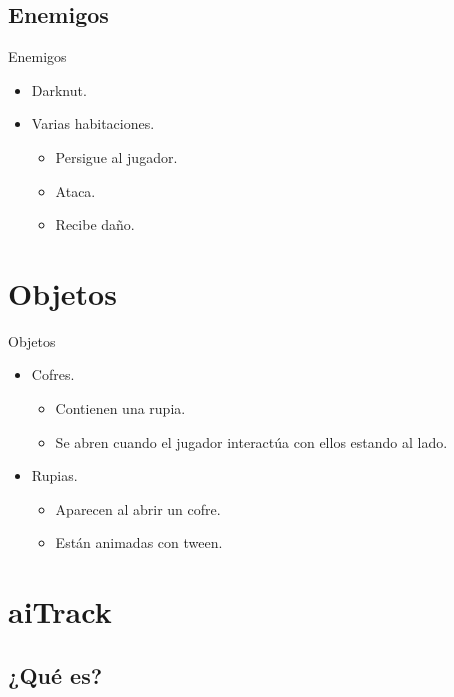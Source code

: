 \documentclass{beamer}
\begin{document}
\subsection{Enemigos}

\begin{frame}{Enemigos}
	\begin{itemize}
		\item Darknut.
		\item Varias habitaciones.
		      \begin{itemize}
			      \item Persigue al jugador.
			      \item Ataca.
			      \item Recibe daño.
		      \end{itemize}
	\end{itemize}
\end{frame}

\section{Objetos}

\begin{frame}{Objetos}
	\begin{itemize}
		\item Cofres.
		      \begin{itemize}
			      \item Contienen una rupia.
			      \item Se abren cuando el jugador interactúa con ellos estando al lado.
		      \end{itemize}
		      \medskip
		\item Rupias.
		      \begin{itemize}
			      \item Aparecen al abrir un cofre.
			      \item Están animadas con tween.
		      \end{itemize}
	\end{itemize}
\end{frame}

\section{aiTrack}

\subsection{¿Qué es?}
\end{document}
